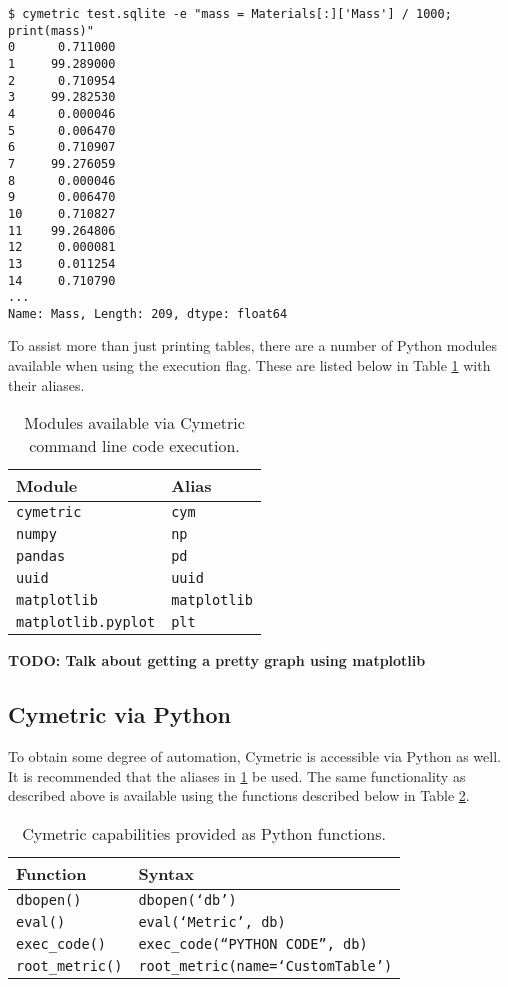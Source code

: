 \documentclass{anstrans}
\newcommand{\TODO}[1] {{\color{red}\textbf{TODO: #1}}}
\newcommand{\code}[1]{{\color{code}\texttt{#1}}}
\begin{document}
\begin{lstlisting}[caption ={Calculating and Manipulating Metrics}, label=mass]
$ cymetric test.sqlite -e "mass = Materials[:]['Mass'] / 1000; print(mass)"
0      0.711000
1     99.289000
2      0.710954
3     99.282530
4      0.000046
5      0.006470
6      0.710907
7     99.276059
8      0.000046
9      0.006470
10     0.710827
11    99.264806
12     0.000081
13     0.011254
14     0.710790
...
Name: Mass, Length: 209, dtype: float64
\end{lstlisting}

To assist more than just printing tables, there are a number of Python modules available when using the execution  flag. These are listed below in Table \ref{tab:modules} with their aliases.

\begin{table}[htb]
  \centering
\begin{tabular}{ll}
\toprule
  Module                   & Alias \\
\midrule
  \code{cymetric}          & \code {cym} \\
  \code{numpy}             & \code{np} \\  
  \code{pandas}            & \code{pd} \\
  \code{uuid}              & \code{uuid} \\
  \code{matplotlib}        & \code{matplotlib} \\
  \code{matplotlib.pyplot} & \code{plt} \\
\bottomrule
\end{tabular}
  \caption{Modules available via Cymetric command line code execution.}
  \label{tab:modules}
\end{table}

\TODO{Talk about getting a pretty graph using matplotlib}

\subsection{Cymetric via Python}
To obtain some degree of automation, Cymetric is accessible via Python as well. It is recommended that the aliases in \ref{tab:modules} be used. The same functionality as described above is available using the functions described below in Table \ref{tab:pyfunc}.

\begin{table}[htb]
  \centering
\begin{tabular}{ll}
\toprule
  Function           & Syntax                 \\
\midrule 
  \code{dbopen()}    & \code{dbopen(`db')}         \\
  \code{eval()}      & \code{eval(`Metric', db)}   \\
  \code{exec\_code()} & \code{exec\_code(``PYTHON CODE'', db)}  \\ 
  \code{root\_metric()} & \code{root\_metric(name=`CustomTable')}  \\
\bottomrule
\end{tabular}
  \caption{Cymetric capabilities provided as Python functions.}
  \label{tab:pyfunc}
\end{table} 
\end{document}
